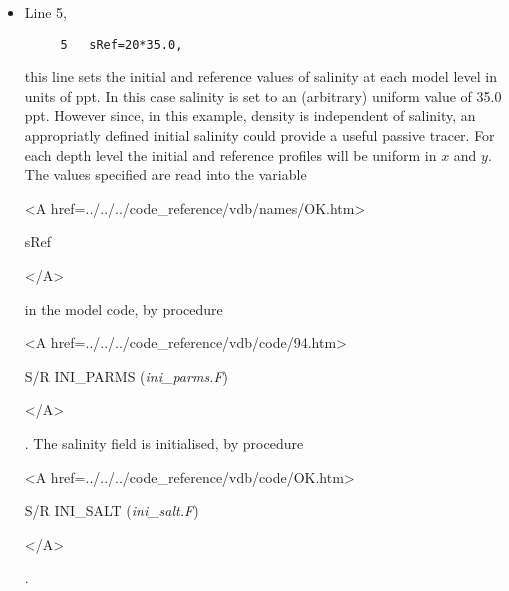 \begin{itemize}
\item Line 5,
\begin{verbatim}
     5	 sRef=20*35.0,
\end{verbatim}
this line sets the initial and reference values of salinity at each model
level in units of ppt. In this case salinity is set to an (arbitrary) uniform value of 
35.0 ppt. However since, in this example, density is independent of salinity, 
an appropriatly defined initial salinity could provide a useful passive 
tracer. For each depth level the initial and reference profiles will be uniform in
$x$ and $y$. The values specified are read into the
variable 
{\bf
\begin{rawhtml} <A href=../../../code_reference/vdb/names/OK.htm> \end{rawhtml}
sRef
\begin{rawhtml} </A>\end{rawhtml}
} 
in the model code, by procedure 
{\it
\begin{rawhtml} <A href=../../../code_reference/vdb/code/94.htm> \end{rawhtml}
S/R INI\_PARMS ({\it ini\_parms.F})
}
\begin{rawhtml} </A>\end{rawhtml}.
The salinity field is initialised, by procedure 
{\it
\begin{rawhtml} <A href=../../../code_reference/vdb/code/OK.htm> \end{rawhtml}
S/R INI\_SALT ({\it ini\_salt.F})
\begin{rawhtml} </A>\end{rawhtml}.
}



\end{itemize}
